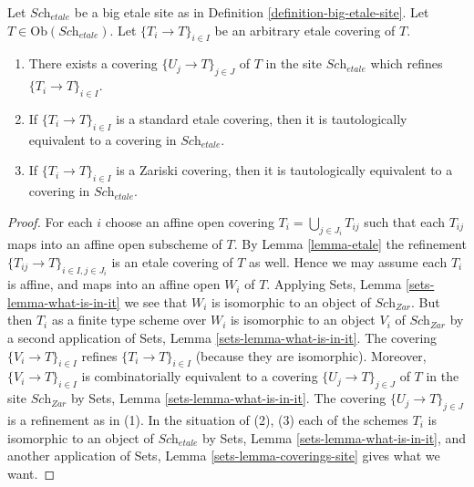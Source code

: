 \begin{lemma}
\label{lemma-etale-induced}
Let $\textit{Sch}_{etale}$ be a big etale site as in
Definition \ref{definition-big-etale-site}.
Let $T \in \text{Ob}(\textit{Sch}_{etale})$.
Let $\{T_i \to T\}_{i \in I}$ be an arbitrary etale covering of $T$.
\begin{enumerate}
\item There exists a covering $\{U_j \to T\}_{j \in J}$ of $T$ in the site
$\textit{Sch}_{etale}$ which refines $\{T_i \to T\}_{i \in I}$.
\item If $\{T_i \to T\}_{i \in I}$ is a standard etale covering, then
it is tautologically equivalent to a covering in $\textit{Sch}_{etale}$.
\item If $\{T_i \to T\}_{i \in I}$ is a Zariski covering, then
it is tautologically equivalent to a covering in $\textit{Sch}_{etale}$.
\end{enumerate}
\end{lemma}

\begin{proof}
For each $i$ choose an affine open covering $T_i = \bigcup_{j \in J_i} T_{ij}$
such that each $T_{ij}$ maps into an affine open subscheme of $T$. By
Lemma \ref{lemma-etale}
the refinement $\{T_{ij} \to T\}_{i \in I, j \in J_i}$ is an etale covering
of $T$ as well. Hence we may assume each $T_i$ is affine, and maps into
an affine open $W_i$ of $T$. Applying
Sets, Lemma \ref{sets-lemma-what-is-in-it}
we see that $W_i$ is isomorphic to an object of $\textit{Sch}_{Zar}$.
But then $T_i$ as a finite type scheme over $W_i$
is isomorphic to an object $V_i$ of $\textit{Sch}_{Zar}$ by a second
application of
Sets, Lemma \ref{sets-lemma-what-is-in-it}.
The covering $\{V_i \to T\}_{i \in I}$ refines $\{T_i \to T\}_{i \in I}$
(because they are isomorphic).
Moreover, $\{V_i \to T\}_{i \in I}$ is combinatorially equivalent to a
covering $\{U_j \to T\}_{j \in J}$ of $T$ in the site
$\textit{Sch}_{Zar}$ by
Sets, Lemma \ref{sets-lemma-what-is-in-it}.
The covering $\{U_j \to T\}_{j \in J}$ is a refinement as in (1).
In the situation of (2), (3) each of the
schemes $T_i$ is isomorphic to an object of $\textit{Sch}_{etale}$ by
Sets, Lemma \ref{sets-lemma-what-is-in-it},
and another application of
Sets, Lemma \ref{sets-lemma-coverings-site}
gives what we want.
\end{proof}

